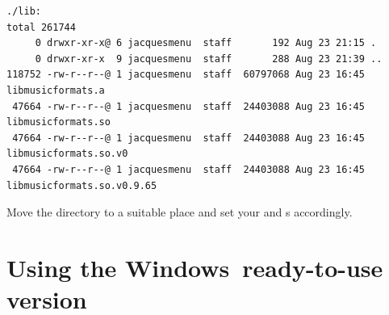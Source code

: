 \begin{lstlisting}[language=Terminal]
./lib:
total 261744
     0 drwxr-xr-x@ 6 jacquesmenu  staff       192 Aug 23 21:15 .
     0 drwxr-xr-x  9 jacquesmenu  staff       288 Aug 23 21:39 ..
118752 -rw-r--r--@ 1 jacquesmenu  staff  60797068 Aug 23 16:45 libmusicformats.a
 47664 -rw-r--r--@ 1 jacquesmenu  staff  24403088 Aug 23 16:45 libmusicformats.so
 47664 -rw-r--r--@ 1 jacquesmenu  staff  24403088 Aug 23 16:45 libmusicformats.so.v0
 47664 -rw-r--r--@ 1 jacquesmenu  staff  24403088 Aug 23 16:45 libmusicformats.so.v0.9.65
\end{lstlisting}

Move the  directory to a suitable place and set your  and  \environmentVariable s accordingly.


\section{Using the Windows\texttrademark\ ready-to-use version}


